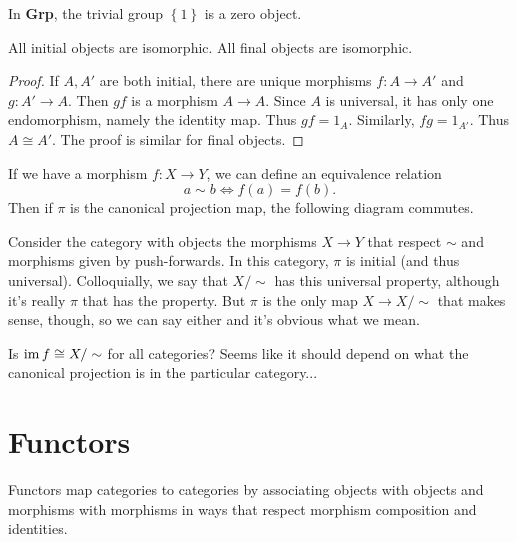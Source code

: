 \documentclass[twoside,10pt]{report}
\begin{document}
\begin{ex}[]
In \textbf{Grp}, the trivial group $\left\{ 1 \right\}$ is a zero object.
\end{ex}

\begin{prop}
	All initial objects are isomorphic. All final objects are isomorphic.
\end{prop}
\begin{proof}
	If $A,A'$ are both initial, there are unique morphisms $f:A\to A'$ and $g:A'\to A$. Then $gf$ is a morphism $A\to A$. Since $A$ is universal, it has only one endomorphism, namely the identity map. Thus $gf=1_{A}$. Similarly, $fg=1_{A'}$. Thus $A \cong A'$. The proof is similar for final objects.
\end{proof}

\begin{ex}[]
If we have a morphism $f:X\to Y$, we can define an equivalence relation
\[
	a \sim b \iff f(a) = f(b).
\] Then if $\pi$ is the canonical projection map, the following diagram commutes.
\begin{figure}[H]
	\centering
{}
\end{figure}

Consider the category with objects the morphisms $X\to Y$ that respect $\sim$ and morphisms given by push-forwards. In this category, $\pi$ is initial (and thus universal). Colloquially, we say that $X/\sim$ has this universal property, although it's really $\pi$ that has the property. But $\pi$ is the only map $X \to  X/\sim$ that makes sense, though, so we can say either and it's obvious what we mean.

{\color{red}Is $\operatorname{im} f \cong X/\sim$ for all categories? Seems like it should depend on what the canonical projection is in the particular category...}
\end{ex}


\section{Functors}

Functors map categories to categories by associating objects with objects and morphisms with morphisms in ways that respect morphism composition and identities.
\end{document}
